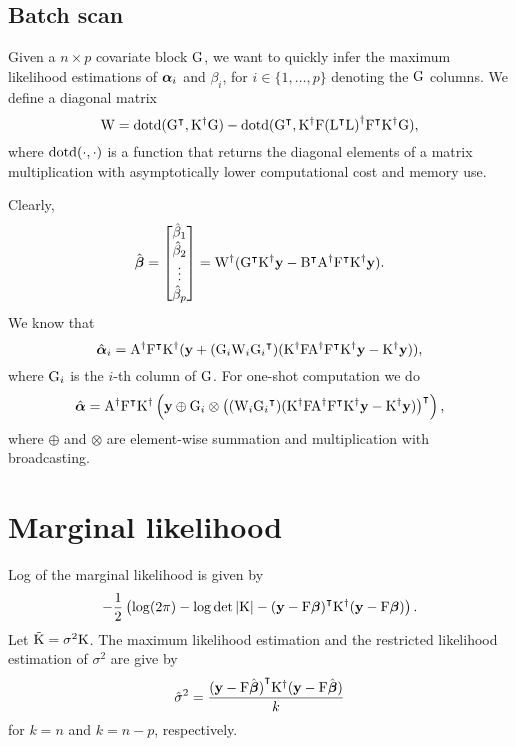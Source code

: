 \documentclass[twocolumn,draft]{article}
\begin{document}
\subsection{Batch scan}

Given a $n\times p$ covariate block $\mathrm{G}$, we want to quickly infer the
maximum likelihood estimations of $\boldsymbol{\alpha}_i$ and $\beta_i$, for
$i \in \{1, \dots, p\}$ denoting the $\mathrm{G}$ columns.
We define a diagonal matrix
\begin{equation*}
	\mathrm{W} = \mathrm{dotd} ({\mathrm{G}}^\intercal, {\mathrm{K}}^{\dagger}\mathrm{G}) -
	       \mathrm{dotd} ({\mathrm{G}}^\intercal, {\mathrm{K}}^{\dagger}\mathrm{F}
				 {({\mathrm{L}}^\intercal\mathrm{L})}^{\dagger}{\mathrm{F}}^\intercal{\mathrm{K}}^{\dagger}\mathrm{G}),
\end{equation*}
where $\mathrm{dotd} (\cdot, \cdot)$ is a function that returns the diagonal elements
of a matrix multiplication with asymptotically lower computational cost and
memory use.

Clearly,
\begin{equation*}
	\hat{\boldsymbol{\beta}} =
	\begin{bmatrix}
		\hat\beta_1 \\
		\hat\beta_2 \\
		\vdots \\
		\hat\beta_p
	\end{bmatrix}
	= {\mathrm{W}}^{\dagger}({\mathrm{G}}^\intercal{\mathrm{K}}^{\dagger}\mathbf{y}
	-{\mathrm{B}}^\intercal{\mathrm{A}}^{\dagger}{\mathrm{F}}^\intercal{\mathrm{K}}^{\dagger}\mathbf{y}).
\end{equation*}
We know that
\begin{equation*}
	\hat{\boldsymbol{\alpha}}_i = {\mathrm{A}}^{\dagger}{\mathrm{F}}^\intercal{\mathrm{K}}^{\dagger}
	(\mathbf{y} + (\mathrm{G}_i \mathrm{W}_i {\mathrm{G}_i}^\intercal)
	({\mathrm{K}}^{\dagger}\mathrm{F}{\mathrm{A}}^{\dagger}{\mathrm{F}}^\intercal{\mathrm{K}}^{\dagger}\mathbf{y} - {\mathrm{K}}^{\dagger}\mathbf{y})),
\end{equation*}
where $\mathrm{G}_i$ is the $i$-th column of $\mathrm{G}$.
For one-shot computation we do
\begin{equation*}
	\hat{\boldsymbol{\alpha}} = {\mathrm{A}}^{\dagger}{\mathrm{F}}^\intercal{\mathrm{K}}^{\dagger}
	\left(\mathbf{y} \oplus \mathrm{G}_i \otimes
	{\left((\mathrm{W}_i {\mathrm{G}_i}^\intercal)
	  ({\mathrm{K}}^{\dagger}\mathrm{F}{\mathrm{A}}^{\dagger}{\mathrm{F}}^\intercal{\mathrm{K}}^{\dagger}\mathbf{y}- {\mathrm{K}}^{\dagger}\mathbf{y})\right)}^\intercal\right),
\end{equation*}
where $\oplus$ and $\otimes$ are element-wise summation and multiplication
with broadcasting.

\section{Marginal likelihood}

Log of the marginal likelihood is given by
\begin{equation*}
	-\frac{1}{2}\left(\log(2\pi) - \log\det|\mathrm{K}|
	- {(\mathbf{y} - \mathrm{F}\boldsymbol{\beta})}^\intercal {\mathrm{K}}^{\dagger} (\mathbf{y} - \mathrm{F}\boldsymbol{\beta})\right).
\end{equation*}
Let $\tilde{\mathrm{K}} = \sigma^2\mathrm{K}$.
The maximum likelihood estimation and the restricted likelihood estimation of
$\sigma^2$ are give by
\begin{equation*}
	\hat\sigma^2 = \frac{
		{(\mathbf{y} - \mathrm{F}\hat{\boldsymbol{\beta}})}^\intercal
			{\mathrm{K}}^{\dagger}
		(\mathbf{y} - \mathrm{F}\hat{\boldsymbol{\beta}})
	}{k}
\end{equation*}
for $k = n$ and $k = n - p$, respectively.

\printbibliography\
\end{document}
